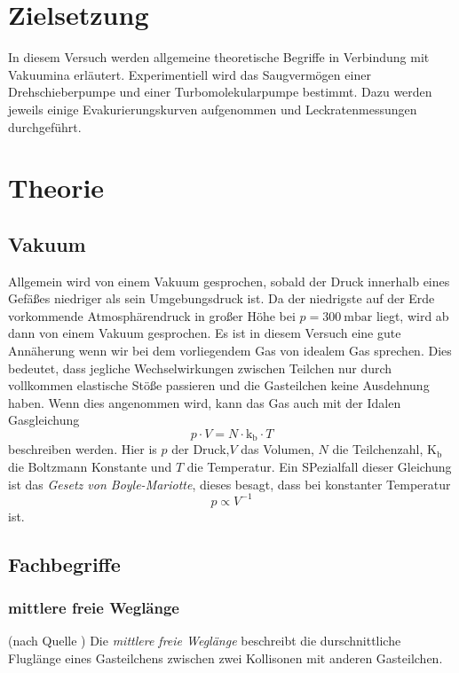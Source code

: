 \section{Zielsetzung}

	In diesem Versuch werden allgemeine theoretische Begriffe in Verbindung mit Vakuumina erläutert.
	Experimentiell wird das Saugvermögen einer Drehschieberpumpe und einer Turbomolekularpumpe bestimmt.
	Dazu werden jeweils einige Evakurierungskurven aufgenommen und Leckratenmessungen durchgeführt.

\section{Theorie}
	
	\subsection{Vakuum}
		
		Allgemein wird von einem Vakuum gesprochen, sobald der Druck innerhalb eines Gefäßes niedriger als sein Umgebungsdruck ist.
		Da der niedrigste auf der Erde vorkommende Atmosphärendruck in großer Höhe bei $p = \SI{300}{\milli\bar}$ liegt, wird ab dann von einem Vakuum gesprochen.
		Es ist in diesem Versuch eine gute Annäherung wenn wir bei dem vorliegendem Gas von idealem Gas sprechen. 
		Dies bedeutet, dass jegliche Wechselwirkungen zwischen Teilchen nur durch vollkommen elastische Stöße passieren und die Gasteilchen keine Ausdehnung haben.
		Wenn dies angenommen wird, kann das Gas auch mit der Idalen Gasgleichung
		\begin{equation}
			p \cdot V = N \cdot \text{k}_\text{b} \cdot T
		\end{equation}
		beschreiben werden.
		Hier is $p$ der Druck,$V$ das Volumen, $N$ die Teilchenzahl, $\text{K}_\text{b}$ die Boltzmann Konstante und $T$ die Temperatur. 
		Ein SPezialfall dieser Gleichung ist das \textit{Gesetz von Boyle-Mariotte}, dieses besagt, dass bei konstanter Temperatur
		\begin{equation}
			p \propto V^{-1}
		\end{equation}
		ist.

	\subsection{Fachbegriffe}

		\subsubsection{mittlere freie Weglänge}(nach Quelle \cite{wiki:mfW})
			\noindent
			Die \textit{mittlere freie Weglänge} beschreibt die durschnittliche Fluglänge eines Gasteilchens zwischen zwei Kollisonen mit anderen Gasteilchen.

